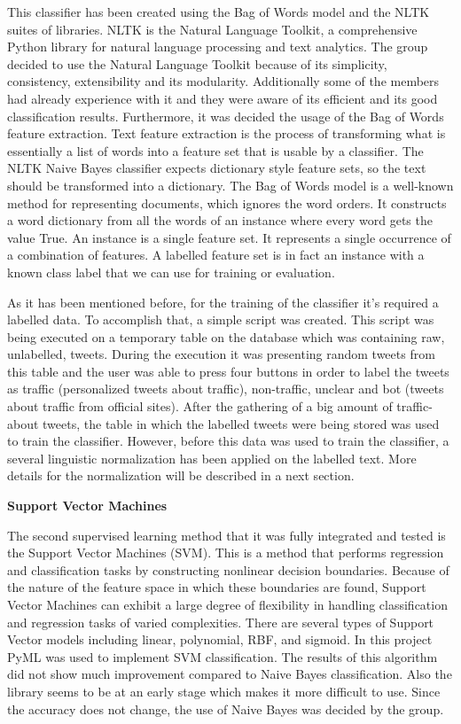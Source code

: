 This classifier has been created using the Bag of Words model and the NLTK suites of libraries. NLTK is the Natural Language Toolkit, a comprehensive Python library for natural language processing and text analytics. The group decided to use the Natural Language Toolkit because of its simplicity, consistency, extensibility and its modularity. Additionally some of the members had already experience with it and they were aware of its efficient and its good classification results. Furthermore, it was decided the usage of the Bag of Words feature extraction. Text feature extraction is the process of transforming what is essentially a list of words into a feature set that is usable by a classifier. The NLTK Naive Bayes classifier expects dictionary style feature sets, so the text should be transformed into a dictionary. The Bag of Words model is a well-known method for representing documents, which ignores the word orders. It constructs a word dictionary from all the words of an instance where every word gets the value True. An instance is a single feature set. It represents a single occurrence of a combination of features. A labelled feature set is in fact an instance with a known class label that we can use for training or evaluation.

As it has been mentioned before, for the training of the classifier it’s required a labelled data. To accomplish that, a simple script was created. This script was being executed on a temporary table on the database which was containing raw, unlabelled, tweets. During the execution it was presenting random tweets from this table and the user was able to press four buttons in order to label the tweets as traffic (personalized tweets about traffic), non-traffic, unclear and bot (tweets about traffic from official sites). After the gathering of a big amount of traffic-about tweets, the table in which the labelled tweets were being stored was used to train the classifier. However, before this data was used to train the classifier, a several linguistic normalization has been applied on the labelled text.  More details for the normalization will be described in a next section.

\textbf{Support Vector Machines}

The second supervised learning method that it was fully integrated and tested is the Support Vector Machines (SVM). This is a method that performs regression and classification tasks by constructing nonlinear decision boundaries. Because of the nature of the feature space in which these boundaries are found, Support Vector Machines can exhibit a large degree of flexibility in handling classification and regression tasks of varied complexities. There are several types of Support Vector models including linear, polynomial, RBF, and sigmoid.
In this project PyML was used to implement SVM classification. The results of
this algorithm did not show much improvement compared to Naive Bayes
classification. Also the library seems to be at an early stage which makes it
more difficult to use. Since the accuracy does not change, the use of Naive
Bayes was decided by the group.

